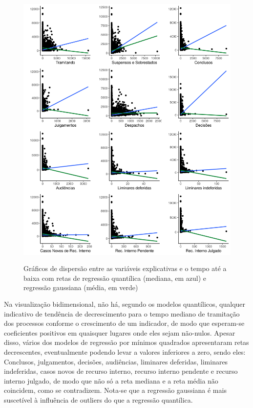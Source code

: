 \begin{figure}[H]
    \centering
    \caption{Gráficos de dispersão entre as variáveis explicativas e o tempo até a baixa com retas de regressão quantílica (mediana, em azul) e regressão gaussiana (média, em verde)}
    \includegraphics[scale=.745]{imagens/cross_charts.png}
    \label{fig:cross_charts}
\end{figure}

Na visualização bidimensional, não há, segundo os modelos quantílicos, qualquer indicativo de tendência de decrescimento para o tempo mediano de tramitação dos processos conforme o crescimento de um indicador, de modo que esperam-se coeficientes positivos em quaisquer lugares onde eles sejam não-nulos. Apesar disso, vários dos modelos de regressão por mínimos quadrados apresentaram retas decrescentes, eventualmente podendo levar a valores inferiores a zero, sendo eles: Conclusos, julgamentos, decisões, audiências, liminares deferidas, liminares indeferidas, casos novos de recurso interno, recurso interno pendente e recurso interno julgado, de modo que não só a reta mediana e a reta média não coincidem, como se contradizem. Nota-se que a regressão gaussiana é mais suscetível à influência de outliers do que a regressão quantílica.

